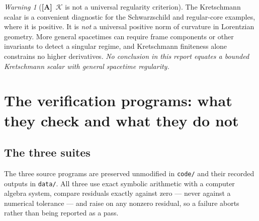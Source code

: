 \documentclass[11pt,letterpaper]{article}
\numberwithin{equation}{section}
\theoremstyle{definition}
\theoremstyle{remark}
\newtheorem{warning}[theorem]{Warning}
\newcommand{\Kret}{\mathcal K}
\newcommand{\TA}{\textcolor{TierA}{\textsf{\bfseries[A]}}}
\begin{document}
\begin{warning}[\TA\ $\Kret$ is not a universal regularity criterion]
\label{phys:warn:notuniversal}
The Kretschmann scalar is a convenient diagnostic for the Schwarzschild and
regular-core examples, where it is positive. It is \emph{not} a universal
positive norm of curvature in Lorentzian geometry. More general spacetimes can
require frame components or other invariants to detect a singular regime, and
Kretschmann finiteness alone constrains no higher derivatives. \emph{No
conclusion in this report equates a bounded Kretschmann scalar with general
spacetime regularity.}
\end{warning}

\section{The verification programs: what they check and what they do not}
\label{phys:app:verification}

\subsection{The three suites}
\label{phys:app:sub:suites}

The three source programs are preserved unmodified in \texttt{code/} and their
recorded outputs in \texttt{data/}. All three use exact symbolic arithmetic
with a computer algebra system, compare residuals exactly against zero ---
never against a numerical tolerance --- and raise on any nonzero residual, so a
failure aborts rather than being reported as a pass.
\end{document}
